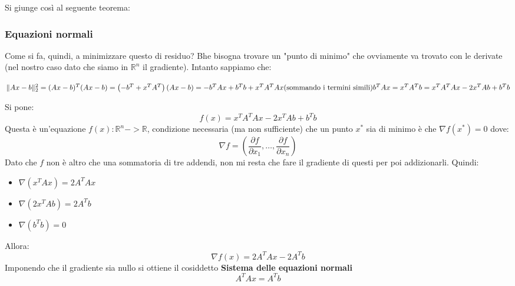 Si giunge così al seguente teorema:

\subsubsection{Equazioni  normali}
Come si fa, quindi, a minimizzare questo di residuo? Bhe bisogna trovare un "punto di minimo" che ovviamente va trovato con le derivate (nel nostro caso dato che siamo in $\mathbb{R}^n$ il gradiente). Intanto sappiamo che:
\begin{center}
    \begin{math}
        \|Ax - b\|_2^2 = (Ax - b)^T (Ax - b) \\
        = \left( -b^T + x^T A^T \right) (Ax - b) \\
        = -b^T A x + b^T b + x^T A^T A x \\
        \text{(sommando i termini simili)} \\
        b^T A x = x^T A^T b \\
        = x^T A^T A x - 2 x^T A b + b^T b
    \end{math}
\end{center}

Si pone:
\[
    f(x) = x^T A^T Ax - 2x^T Ab + b^T b
\]
Questa è un'equazione $f(x): \mathbb{R}^n -> \mathbb{R}$, condizione necessaria (ma non sufficiente) che un punto $x^*$ sia di minimo è che $\nabla f(x^*) = 0$ dove:
\[
    \nabla f = (\frac{\partial f}{\partial x_1}, \dots, \frac{\partial f}{\partial x_n}
    )
\]
Dato che $f$ non è altro che una sommatoria di tre addendi, non mi resta che fare il gradiente di questi per poi addizionarli. Quindi:
\begin{itemize}
    \item $\nabla(x^TAx)=2A^TAx$
    \item $\nabla(2x^T Ab)=2A^Tb$
    \item $\nabla( b^T b)=0$
\end{itemize}
Allora:
\[
    \nabla f(x)=2A^TAx-2A^Tb
\]
Imponendo che il gradiente sia nullo si ottiene il cosiddetto \textbf{Sistema delle equazioni normali}
\[
    A^T Ax = A^T b    
\]

